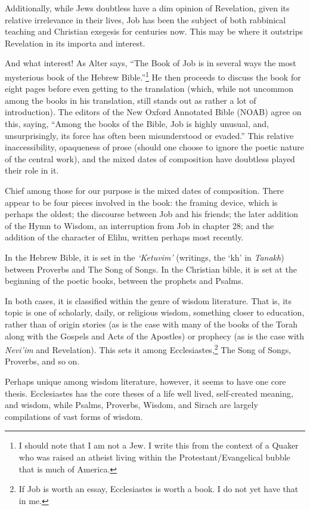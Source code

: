 Additionally, while Jews doubtless have a dim opinion of Revelation, given its relative irrelevance in their lives, Job has been the subject of both rabbinical teaching and Christian exegesis for centuries now. This may be where it outstrips Revelation in its importa and interest.

And what interest! As Alter says, ``The Book of Job is in several ways the most mysterious book of the Hebrew Bible.''\footnote{I should note that I am not a Jew. I write this from the context of a Quaker who was raised an atheist living within the Protestant/Evangelical bubble that is much of America.} \parencite[457]{alter} He then proceeds to discuss the book for eight pages before even getting to the translation (which, while not uncommon among the books in his translation, still stands out as rather a lot of introduction). The editors of the New Oxford Annotated Bible (NOAB) agree on this, saying, ``Among the books of the Bible, Job is highly unusual, and, unsurprisingly, its force has often been misunderstood or evaded.'' \parencite[735]{noab} This relative inaccessibility, opaqueness of prose (should one choose to ignore the poetic nature of the central work), and the mixed dates of composition have doubtless played their role in it.

Chief among those for our purpose is the mixed dates of composition. There appear to be four pieces involved in the book: the framing device, which is perhaps the oldest; the discourse between Job and his friends; the later addition of the Hymn to Wisdom, an interruption from Job in chapter 28; and the addition of the character of Elihu, written perhaps most recently.

In the Hebrew Bible, it is set in the \emph{`Ketuvim'} (writings, the `kh' in \emph{Tanakh}) between Proverbs and The Song of Songs. In the Christian bible, it is set at the beginning of the poetic books, between the prophets and Psalms.

In both cases, it is classified within the genre of wisdom literature. That is, its topic is one of scholarly, daily, or religious wisdom, something closer to education, rather than of origin stories (as is the case with many of the books of the Torah along with the Gospels and Acts of the Apostles) or prophecy (as is the case with \emph{Nevi'im} and Revelation). This sets it among Ecclesiastes,\footnote{If Job is worth an essay, Ecclesiastes is worth a book. I do not yet have that in me.} The Song of Songs, Proverbs, and so on.

Perhaps unique among wisdom literature, however, it seems to have one core thesis. Ecclesiastes has the core theses of a life well lived, self-created meaning, and wisdom, while Psalms, Proverbs, Wisdom, and Sirach are largely compilations of vast forms of wisdom.

